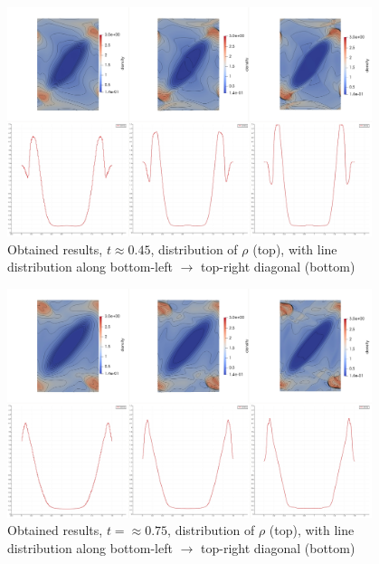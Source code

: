 \begin{figure}[H]
	\begin{center}
		\includegraphics[width=0.95\textwidth]{img/mhd-blast/new/blast,noadapt9.jpg}
	\caption{Obtained results, $t \approx 0.45$, distribution of $\rho$ (top), with line distribution along bottom-left $\rightarrow$ top-right diagonal (bottom)}
	\label{figure:blastNew04}
	\end{center}
\end{figure}
\vspace{-8mm}

\begin{figure}[H]
	\begin{center}
		\includegraphics[width=0.95\textwidth]{img/mhd-blast/new/blast,noadapt14.jpg}
	\caption{Obtained results, $t = \approx 0.75$, distribution of $\rho$ (top), with line distribution along bottom-left $\rightarrow$ top-right diagonal (bottom)}
	\label{figure:blastNew05}
	\end{center}
\end{figure}
\vspace{-8mm}

